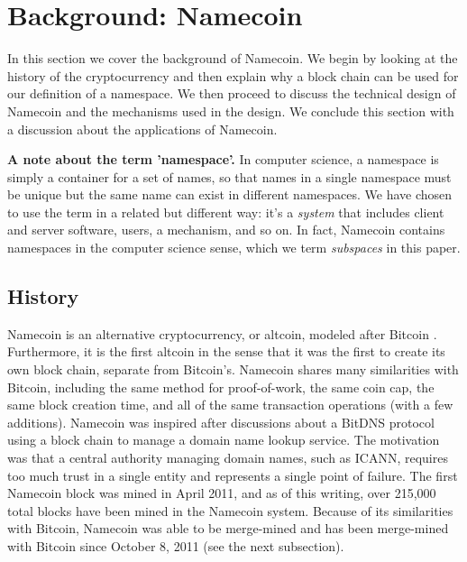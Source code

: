 \section{Background: Namecoin}
\label{sec:background}

In this section we cover the background of Namecoin. We begin by looking at the history of the cryptocurrency and then explain why a block chain can be used for our definition of a namespace. We then proceed to discuss the technical design of Namecoin and the mechanisms used in the design. We conclude this section with a discussion about the applications of Namecoin.

{\bf A note about the term 'namespace'.} In computer science, a namespace is simply a container for a set of names, so that names in a single namespace must be unique but the same name can exist in different namespaces. We have chosen to use the term in a related but different way: it's a {\em system} that includes client and server software, users, a mechanism, and so on. In fact, Namecoin contains namespaces in the computer science sense, which we term {\em subspaces} in this paper.

\subsection{History}

Namecoin is an alternative cryptocurrency, or altcoin, modeled after Bitcoin \cite{nakamoto2008bitcoin}. Furthermore, it is the first altcoin in the sense that it was the first to create its own block chain, separate from Bitcoin's.  Namecoin shares many similarities with Bitcoin, including the same method for proof-of-work, the same coin cap, the same block creation time, and all of the same transaction operations (with a few additions). Namecoin was inspired after discussions about a BitDNS \cite{bitdns} protocol using a block chain to manage a domain name lookup service. The motivation was that a central authority managing domain names, such as ICANN, requires too much trust in a single entity and represents a single point of failure. The first Namecoin block was mined in April 2011, and as of this writing, over 215,000 total blocks have been mined in the Namecoin system. Because of its similarities with Bitcoin, Namecoin was able to be merge-mined and has been merge-mined with Bitcoin since October 8, 2011 (see the next subsection). 

